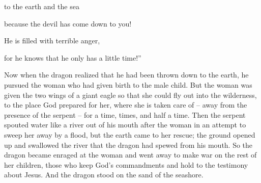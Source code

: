 {to the earth
and
the sea
\par }{\Q because
the devil
has come down
to
you!
\par }{\Q He is filled
with terrible
anger,
\par }{\Q for he knows
that
he
only has
a little
time!”
\par }{\PP {}Now
when
the dragon
realized
that
he had been thrown down
to
the earth,
he pursued
the woman
who
had given birth
to the male child.
But
the woman
was given
the two
wings
of a giant
eagle
so that
she could fly out
into
the wilderness,
to
the place
God prepared for her,
where
she is taken care of – away from the presence of the serpent – for a time, times, and half a time.
Then
the serpent
spouted
water
like
a river
out
of his
mouth
after
the woman
in an attempt
to
sweep
her
away by a flood,
but
the earth
came to
her
rescue;
the ground
opened up
and swallowed
the river
that
the dragon
had spewed
from
his
mouth.
So
the dragon
became enraged
at
the woman
and
went away
to make
war
on
the rest
of her
children,
those who keep
God’s
commandments
and
hold
to the testimony
about Jesus. And the dragon stood on the sand of the seashore.

}
